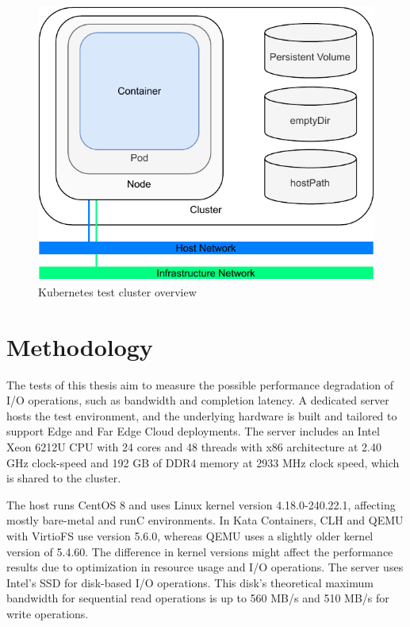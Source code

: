 \begin{figure}[ht]
  \begin{center}
    \includegraphics[width=12cm]{images/TestArchitectureClusterSimple.pdf}
    \caption{Kubernetes test cluster overview}
    \label{fig:TestArchitectureCluster}
  \end{center}
\end{figure}

\section{Methodology}

The tests of this thesis aim to measure the possible performance degradation of I/O operations, such as bandwidth and completion latency. A dedicated server hosts the test environment, and the underlying hardware is built and tailored to support Edge and Far Edge Cloud deployments. The server includes an Intel Xeon 6212U CPU with 24 cores and 48 threads with x86 architecture at 2.40 GHz clock-speed and 192 GB of DDR4 memory at 2933 MHz clock speed, which is shared to the cluster.

The host runs CentOS 8 and uses Linux kernel version 4.18.0-240.22.1, affecting mostly bare-metal and runC environments. In Kata Containers, CLH and QEMU with VirtioFS use version 5.6.0, whereas QEMU uses a slightly older kernel version of 5.4.60. The difference in kernel versions might affect the performance results due to optimization in resource usage and I/O operations. The server uses Intel's SSD \cite{IntelSSD} for disk-based I/O operations. This disk's theoretical maximum bandwidth for sequential read operations is up to 560 MB/s and 510 MB/s for write operations.

